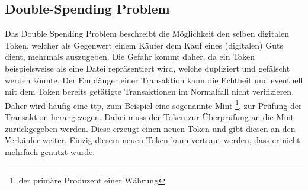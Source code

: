 \subsection{Double-Spending Problem}
\label{sec:sota_doublespend}
	Das Double Spending Problem beschreibt die Möglichkeit den selben digitalen Token, welcher als Gegenwert einem Käufer dem Kauf eines (digitalen) Guts dient, mehrmals auszugeben\cite{Chohan2017}.
	Die Gefahr kommt daher, da ein Token beispielsweise als eine Datei repräsentiert wird, welche dupliziert und gefälscht werden könnte\cite{Chohan2017}.
	Der Empfänger einer Transaktion kann die Echtheit und eventuell mit dem Token bereits getätigte Transaktionen im Normalfall nicht verifizieren\cite{Nakamoto2008}.
	Daher wird häufig eine \gls{ttp}, zum Beispiel eine sogenannte Mint \!\footnote{der primäre Produzent einer Währung}, zur Prüfung der Transaktion herangezogen\cite{Nakamoto2008}.
	Dabei muss der Token zur Überprüfung an die Mint zurückgegeben werden. 
	Diese erzeugt einen neuen Token und gibt diesen an den Verkäufer weiter.
	Einzig diesem neuen Token kann vertraut werden, dass er nicht mehrfach genutzt wurde\cite{Nakamoto2008}.